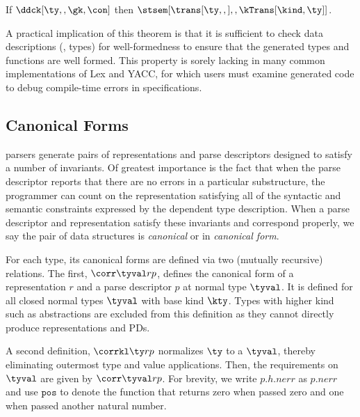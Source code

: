 \begin{theorem}
\label{thm:type-correctness}
  If $\ddck[\ty,,\gk,\con]$ then
  $\stsem[{\trans[\ty,,]},,\kTrans[\kind,\ty]]$.
\end{theorem}

A practical implication of this theorem is that it is sufficient to
check data descriptions (\ie{}, \ddca{} types) for well-formedness to
ensure that the generated types and functions are well formed. This
property is sorely lacking in many common implementations of Lex and
YACC, for which users must examine generated code to debug
compile-time errors in specifications.

\subsection{Canonical Forms}

\ddc{} parsers generate pairs of representations and parse descriptors
designed to satisfy a number of invariants.  Of greatest importance is
the fact that when the parse descriptor reports that there are no errors in a
particular substructure, the programmer can count on the
representation satisfying all of the syntactic and semantic
constraints expressed by the dependent \ddc{} type description.  When
a parse descriptor and representation satisfy these invariants and
correspond properly, we say the pair of data structures is {\em
  canonical} or in {\em canonical form}.

For each \ddc{} type, its canonical forms are defined via two
(mutually recursive) relations.  The first, $\corr \tyval r p$,
defines the canonical form of a representation $r$ and a parse
descriptor $p$ at normal type $\tyval$.  It is defined for all closed
normal types $\tyval$ with base kind $\kty$.  Types with higher kind
such as abstractions are excluded from this definition as they cannot
directly produce representations and PDs.

A second definition, $\corrkl \ty r p$ normalizes $\ty$ to a $\tyval$,
thereby eliminating outermost type and value applications. Then, the
requirements on $\tyval$ are given by $\corr \tyval r p$.  For
brevity, we write $p.h.{nerr}$ as $p.{nerr}$ and use $\mathtt{pos}$ to
denote the function that returns zero when passed zero and one when
passed another natural number.

